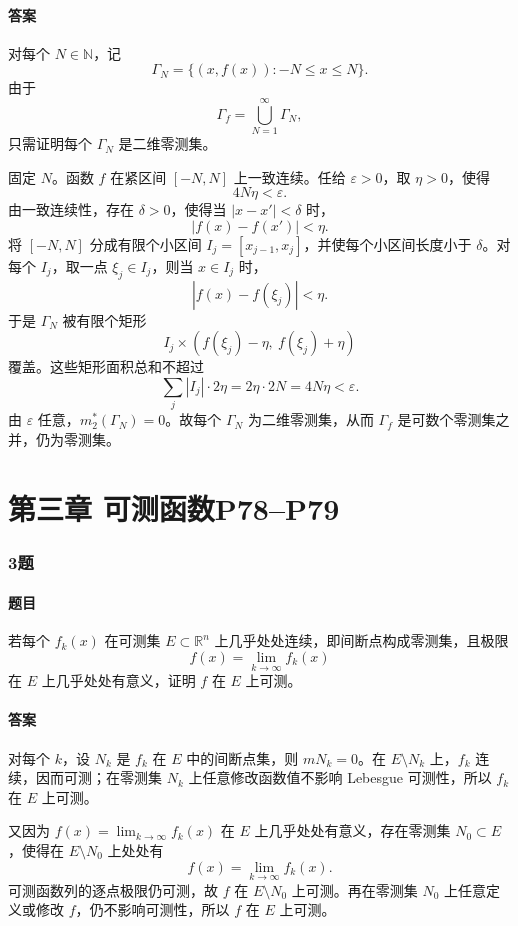 \documentclass{article}
\newcommand{\eps}{\varepsilon}
\begin{document}
	\paragraph{答案} 对每个 $N\in\mathbb{N}$，记
	\[
	\Gamma_N=\{(x,f(x)):-N\le x\le N\}.
	\]
	由于
	\[
	\Gamma_f=\bigcup_{N=1}^{\infty}\Gamma_N,
	\]
	只需证明每个 $\Gamma_N$ 是二维零测集。
	
	固定 $N$。函数 $f$ 在紧区间 $[-N,N]$ 上一致连续。任给 $\eps>0$，取 $\eta>0$，使得
	\[
	4N\eta<\eps.
	\]
	由一致连续性，存在 $\delta>0$，使得当 $|x-x'|<\delta$ 时，
	\[
	|f(x)-f(x')|<\eta.
	\]
	将 $[-N,N]$ 分成有限个小区间 $I_j=[x_{j-1},x_j]$，并使每个小区间长度小于 $\delta$。对每个 $I_j$，取一点 $\xi_j\in I_j$，则当 $x\in I_j$ 时，
	\[
	|f(x)-f(\xi_j)|<\eta.
	\]
	于是 $\Gamma_N$ 被有限个矩形
	\[
	I_j\times(f(\xi_j)-\eta,\ f(\xi_j)+\eta)
	\]
	覆盖。这些矩形面积总和不超过
	\[
	\sum_j |I_j|\cdot 2\eta=2\eta\cdot 2N=4N\eta<\eps.
	\]
	由 $\eps$ 任意，$m_2^*(\Gamma_N)=0$。故每个 $\Gamma_N$ 为二维零测集，从而 $\Gamma_f$ 是可数个零测集之并，仍为零测集。
	
	\section*{第三章 \quad 可测函数\quad P78--P79}
	
	\subsubsection*{3题}
	\paragraph{题目} 若每个 $f_k(x)$ 在可测集 $E\subset\mathbb{R}^n$ 上几乎处处连续，即间断点构成零测集，且极限
	\[
	f(x)=\lim_{k\to\infty}f_k(x)
	\]
	在 $E$ 上几乎处处有意义，证明 $f$ 在 $E$ 上可测。
	
	\paragraph{答案} 对每个 $k$，设 $N_k$ 是 $f_k$ 在 $E$ 中的间断点集，则 $mN_k=0$。在 $E\setminus N_k$ 上，$f_k$ 连续，因而可测；在零测集 $N_k$ 上任意修改函数值不影响 Lebesgue 可测性，所以 $f_k$ 在 $E$ 上可测。
	
	又因为 $f(x)=\lim_{k\to\infty}f_k(x)$ 在 $E$ 上几乎处处有意义，存在零测集 $N_0\subset E$，使得在 $E\setminus N_0$ 上处处有
	\[
	f(x)=\lim_{k\to\infty}f_k(x).
	\]
	可测函数列的逐点极限仍可测，故 $f$ 在 $E\setminus N_0$ 上可测。再在零测集 $N_0$ 上任意定义或修改 $f$，仍不影响可测性，所以 $f$ 在 $E$ 上可测。
	
\end{document}
